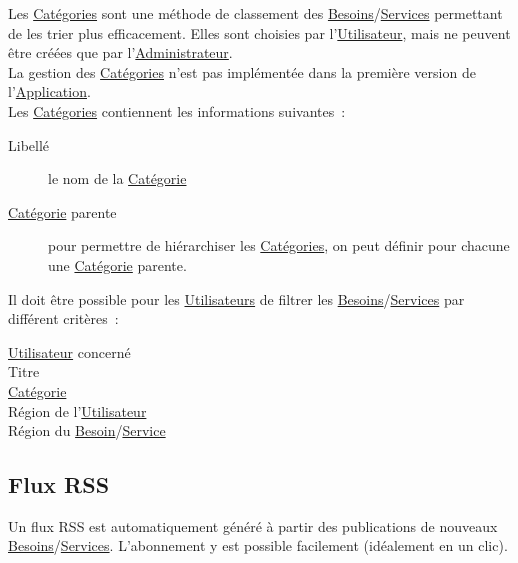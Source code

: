 \documentclass[french,12pt]{article}
\begin{document}
			Les \hyperlink{categorie}{Catégories} sont une méthode de classement des
			 \hyperlink{besoin}{Besoins}/\hyperlink{service}{Services} permettant de
			 les trier plus efficacement. Elles sont choisies par
			 l’\hyperlink{utilisateur}{Utilisateur}, mais ne peuvent être créées que
			 par l’\hyperlink{administrateur}{Administrateur}.\\
			
			La gestion des \hyperlink{categorie}{Catégories} n’est pas implémentée
			 dans la première version de l’\hyperlink{application}{Application}.\\
			
			Les \hyperlink{categorie}{Catégories} contiennent les informations
			suivantes :
			\begin{description}
				\item [Libellé]
					le nom de la \hyperlink{categorie}{Catégorie}
				\item [\hyperlink{categorie}{Catégorie} parente]
					pour permettre de hiérarchiser les \hyperlink{categorie}{Catégories},
					 on peut définir pour chacune une \hyperlink{categorie}{Catégorie}
					 parente.
			\end{description}
			
			Il doit être possible pour les \hyperlink{utilisateur}{Utilisateurs} de
			 filtrer les \hyperlink{besoin}{Besoins}/\hyperlink{service}{Services} par
			 différent critères :
			\begin{description}
				\item [\hyperlink{utilisateur}{Utilisateur} concerné]
				\item [Titre]
				\item [\hyperlink{categorie}{Catégorie}]
				\item [Région de l’\hyperlink{utilisateur}{Utilisateur}]
				\item [Région du \hyperlink{besoin}{Besoin}/\hyperlink{service}{Service}]
			\end{description}
			
		\newpage
		\subsection{Flux RSS}
			
			Un flux RSS est automatiquement généré à partir des publications de
			 nouveaux \hyperlink{besoin}{Besoins}/\hyperlink{service}{Services}.
			 L’abonnement y est possible facilement (idéalement en un clic).
			
\end{document}
